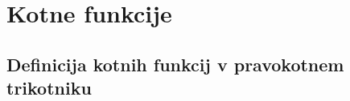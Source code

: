 \chapter{Kotne funkcije}

    \section{Definicija kotnih funkcij v pravokotnem trikotniku}

        
        

                    
                    
                    
                    
                    
                    
                    
                    
